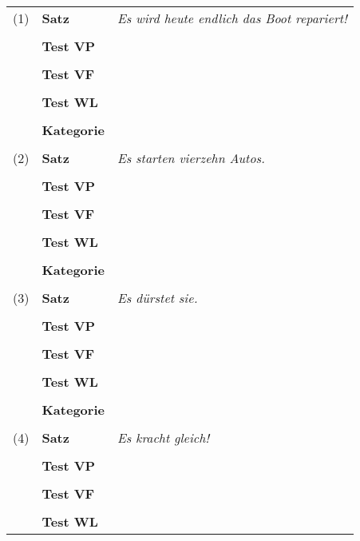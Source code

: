 \documentclass[12pt,a4paper,twoside]{article}
\begin{document}
\begin{center}
  \begin{longtable}[h]{clp{}}
    (1) & \textbf{Satz} & \textit{Es wird heute endlich das Boot repariert!} \\
    &&\\
    & \textbf{Test VP} & \\\cline{3-3}
    &&\\
    & \textbf{Test VF} & \\\cline{3-3}
    &&\\
    & \textbf{Test WL} & \\\cline{3-3}
    &&\\
    & \textbf{Kategorie} & \\\cline{3-3}
    &&\\
    (2) & \textbf{Satz} & \textit{Es starten vierzehn Autos.} \\
    &&\\
    & \textbf{Test VP} & \\\cline{3-3}
    &&\\
    & \textbf{Test VF} & \\\cline{3-3}
    &&\\
    & \textbf{Test WL} & \\\cline{3-3}
    &&\\
    & \textbf{Kategorie} & \\\cline{3-3}
    &&\\
    (3) & \textbf{Satz} & \textit{Es dürstet sie.} \\
    &&\\
    & \textbf{Test VP} & \\\cline{3-3}
    &&\\
    & \textbf{Test VF} & \\\cline{3-3}
    &&\\
    & \textbf{Test WL} & \\\cline{3-3}
    &&\\
    & \textbf{Kategorie} & \\\cline{3-3}
    &&\\
 \newpage
    (4) & \textbf{Satz} & \textit{Es kracht gleich!} \\
    &&\\
    & \textbf{Test VP} & \\\cline{3-3}
    &&\\
    & \textbf{Test VF} & \\\cline{3-3}
    &&\\
    & \textbf{Test WL} & \\\cline{3-3}

\end{longtable}
\end{center}
\end{document}
